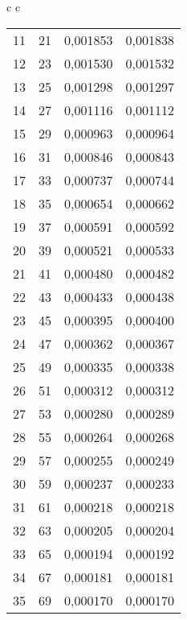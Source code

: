 \begin{center}
\begin{tabular}{c c}
\begin{tabular}{l | c | c c}
            11 &      21 &  0,001853 &  0,001838 \\
            12 &      23 &  0,001530 &  0,001532 \\
            13 &      25 &  0,001298 &  0,001297 \\
            14 &      27 &  0,001116 &  0,001112 \\
            15 &      29 &  0,000963 &  0,000964 \\
            16 &      31 &  0,000846 &  0,000843 \\
            17 &      33 &  0,000737 &  0,000744 \\
            18 &      35 &  0,000654 &  0,000662 \\
            19 &      37 &  0,000591 &  0,000592 \\
            20 &      39 &  0,000521 &  0,000533 \\
            21 &      41 &  0,000480 &  0,000482 \\
            22 &      43 &  0,000433 &  0,000438 \\
            23 &      45 &  0,000395 &  0,000400 \\
            24 &      47 &  0,000362 &  0,000367 \\
            25 &      49 &  0,000335 &  0,000338 \\
            26 &      51 &  0,000312 &  0,000312 \\
            27 &      53 &  0,000280 &  0,000289 \\
            28 &      55 &  0,000264 &  0,000268 \\
            29 &      57 &  0,000255 &  0,000249 \\
            30 &      59 &  0,000237 &  0,000233 \\
            31 &      61 &  0,000218 &  0,000218 \\
            32 &      63 &  0,000205 &  0,000204 \\
            33 &      65 &  0,000194 &  0,000192 \\
            34 &      67 &  0,000181 &  0,000181 \\
            35 &      69 &  0,000170 &  0,000170 \\
        \end{tabular}
    \end{tabular}    
    \label{tab:fourierkoeff}
\end{center}
